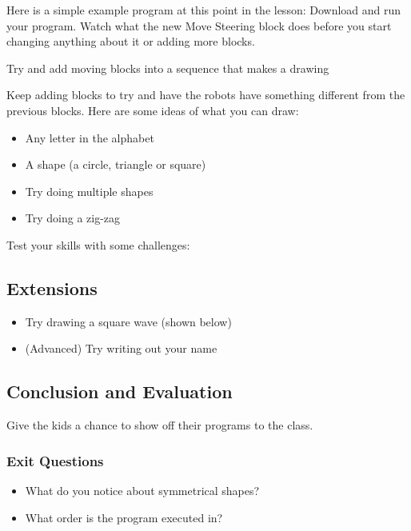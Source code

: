 \documentclass{lessonplan}
\begin{document}
        Here is a simple example program at this point in the lesson:
        Download and run your program. Watch what the new Move Steering block does before you start changing anything about it or adding more blocks.
        \par
        Try and add moving blocks into a sequence that makes a drawing 
        \par
        Keep adding blocks to try and have the robots have  something different from the previous blocks. Here are some ideas of what you can draw:
        \begin{itemize}
            \item Any letter in the alphabet
            \item A shape (a circle, triangle or square) 
            \item Try doing multiple shapes 
            \item Try doing a zig-zag
        \end{itemize}
        Test your skills with some challenges: 
        

    \subsection{Extensions}
      \begin{itemize}
        \item Try drawing a square wave (shown below)
        \item (Advanced) Try writing out your name
      \end{itemize}
    \subsection{Conclusion and Evaluation}
      Give the kids a chance to show off their programs to the class.
      \subsubsection{Exit Questions}
      \begin{itemize}
        \item What do you notice about symmetrical shapes?
        \item What order is the program executed in?
      \end{itemize}
\end{document}
